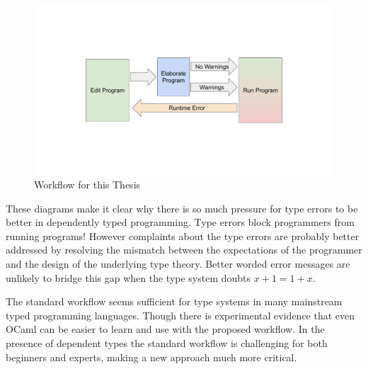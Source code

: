 \begin{figure}
\centerline{\includegraphics[width=5in]{fig/new-workflow.pdf}}

\caption{Workflow for this Thesis}
\label{fig:intro-thesis-workflow}
\end{figure}

These diagrams make it clear why there is so much pressure for type errors to be better in dependently typed programming. %
Type errors block programmers from running programs! However complaints about the type errors are probably better addressed by resolving the mismatch between the expectations of the programmer and the design of the underlying type theory.
Better worded error messages are unlikely to bridge this gap when the type system doubts $x+1=1+x$.

The standard workflow seems sufficient for type systems in many mainstream typed programming languages. 
Though there is experimental evidence that even OCaml can be easier to learn and use with the proposed workflow\cite{10.1145/2951913.2951915}.
In the presence of dependent types the standard workflow is challenging for both beginners and experts, making a new approach much more critical.

